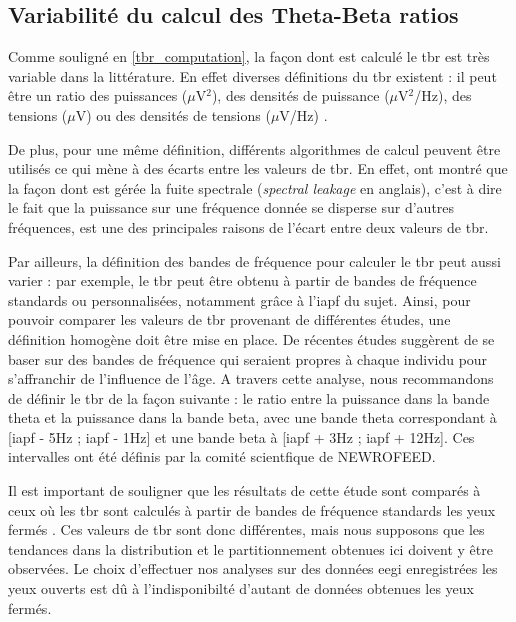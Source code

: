 \subsection{Variabilité du calcul des Theta-Beta ratios} 

Comme souligné en \ref{tbr_computation}, la façon dont est calculé le \gls{tbr} est très variable dans la littérature. En effet diverses définitions du \gls{tbr} existent :
il peut être un ratio des puissances ($\mu$V$^2$), des densités de puissance ($\mu$V$^2$/Hz), des tensions ($\mu$V) ou des densités de tensions ($\mu$V/Hz) 
\citep{Liechti2013}. 

De plus, pour une même définition, différents algorithmes de calcul peuvent être utilisés ce qui mène à des écarts entre les valeurs de \gls{tbr}. En 
effet, \citet{Kerson2019} ont montré que la façon dont est gérée la fuite spectrale (\textit{spectral leakage} en anglais), c'est à dire le fait que la puissance
sur une fréquence donnée se disperse sur d'autres fréquences, est une des principales raisons de l'écart entre deux valeurs de \gls{tbr}. 

Par ailleurs, la définition des bandes de fréquence pour calculer le \gls{tbr} peut aussi varier : par exemple, le \gls{tbr} peut être obtenu à partir
de bandes de fréquence standards ou personnalisées, notamment grâce à l'\gls{iapf} du sujet. Ainsi, pour pouvoir comparer les valeurs de \gls{tbr} provenant de différentes
études, une définition homogène doit être mise en place. De récentes études suggèrent de se baser sur des bandes de fréquence 
qui seraient propres à chaque individu \citep{Zhang2017, Saad2018} pour s'affranchir de l'influence de l'âge. A travers cette analyse, nous recommandons de définir le \gls{tbr} de la façon suivante : 
le ratio entre la puissance dans la bande theta et la puissance dans la bande beta, avec une bande theta correspondant à [\gls{iapf} - 5Hz ; \gls{iapf} - 1Hz]
et une bande beta à [\gls{iapf} + 3Hz ; \gls{iapf} + 12Hz]. Ces intervalles ont été définis par la comité scientfique de NEWROFEED. 

Il est important de souligner que les résultats de cette étude sont comparés à ceux où les \gls{tbr} sont calculés à partir de bandes de fréquence standards
les yeux fermés \citep{Zhang2017, Clarke2011}. Ces valeurs de \gls{tbr} sont donc différentes, mais nous supposons que les tendances dans la distribution et le
partitionnement obtenues ici doivent y être observées. Le choix d'effectuer nos analyses sur des données \gls{eegi} enregistrées les yeux ouverts est dû à l'indisponibilté
d'autant de données obtenues les yeux fermés.

